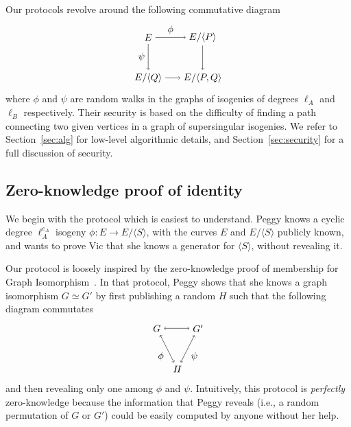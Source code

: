 \documentclass[jmc]{degruyter-journal-a}
\theoremstyle{definition}
\newcommand{\cyc}[1]{{\langle #1 \rangle}}
\begin{document}
Our protocols revolve around the following commutative diagram
\begin{equation}
  \label{eq:square}
  \begin{tikzpicture}[xscale=2,yscale=1.5,baseline=(current bounding box.east)]
    \node(0) at (0,0) {$E$};
    \node(S) at (1,0) {$E/\cyc{P}$};
    \node(R) at (0,-1) {$E/\cyc{Q}$};
    \node(SR) at (1,-1) {$E/\cyc{P,Q}$};
    \path[->] (0) edge node[auto] {$\phi$} (S);
    \path[->] (0) edge node[auto,swap] {$\psi$} (R);
    \path[->] (S) edge (SR);
    \path[->] (R) edge (SR);
  \end{tikzpicture}
\end{equation}
where $\phi$ and $\psi$ are random walks in the graphs of isogenies of
degrees $\ell_A$ and $\ell_B$ respectively. Their security is based on
the difficulty of finding a path connecting two given vertices in a
graph of supersingular isogenies. We refer to Section~\ref{sec:alg}
for low-level algorithmic details, and Section~\ref{sec:security} for
a full discussion of security.

\subsection{Zero-knowledge proof of identity}\label{subsec:zk}

We begin with the protocol which is easiest to understand. Peggy
knows a cyclic degree $\ell_A^{e_A}$ isogeny $\phi:E \to E/\cyc{S}$,
with the curves $E$ and $E/\cyc{S}$ publicly known, and wants to prove
Vic that she knows a generator for $\cyc{S}$, without revealing it.

Our protocol is loosely inspired by the zero-knowledge proof of
membership for Graph
Isomorphism~\cite{goldreich+micali+widgerson91}. In that protocol,
Peggy shows that she knows a graph isomorphism $G \simeq G'$ by first
publishing a random $H$ such that the following diagram commutates
\begin{equation}
  \label{eq:gi}
  \begin{tikzpicture}[xscale=1.5,yscale=1.5,baseline=(current bounding box.east)]
    \node(G) at (0,0) {$G$};
    \node(G') at (1,0) {$G'$};
    \node(H) at (0.5,-1) {$H$};
    \path[<->] (G) edge (G');
    \path[<->] (G) edge node[auto,swap] {$\phi$} (H);
    \path[<->] (G') edge node[auto] {$\psi$} (H);
  \end{tikzpicture}  
\end{equation}
and then revealing only one among $\phi$ and $\psi$. Intuitively, this
protocol is \emph{perfectly} zero-knowledge because the information
that Peggy reveals (i.e., a random permutation of $G$ or $G'$) could
be easily computed by anyone without her help.
\end{document}
